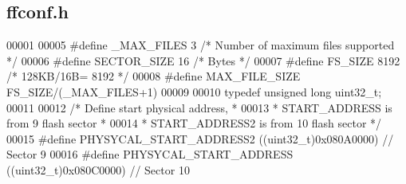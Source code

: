 \hypertarget{ffconf_8h_source}{\subsection{ffconf.\+h}
\label{ffconf_8h_source}
}

\begin{DoxyCode}
00001 
00005 \textcolor{preprocessor}{#define \_MAX\_FILES 3   }\textcolor{comment}{/* Number of maximum files supported */}\textcolor{preprocessor}{}
00006 \textcolor{preprocessor}{#define SECTOR\_SIZE 16 }\textcolor{comment}{/* Bytes */}\textcolor{preprocessor}{}
00007 \textcolor{preprocessor}{#define FS\_SIZE 8192  }\textcolor{comment}{/* 128KB/16B= 8192 */}\textcolor{preprocessor}{}
00008 \textcolor{preprocessor}{#define MAX\_FILE\_SIZE FS\_SIZE/(\_MAX\_FILES+1)}
00009 
00010 \textcolor{keyword}{typedef} \textcolor{keywordtype}{unsigned} \textcolor{keywordtype}{long} uint32\_t;
00011 
00012 \textcolor{comment}{/* Define start physical address,           *}
00013 \textcolor{comment}{ * START\_ADDRESS is from 9 flash sector     *}
00014 \textcolor{comment}{ * START\_ADDRESS2 is from 10 flash sector   */}
00015 \textcolor{preprocessor}{#define PHYSYCAL\_START\_ADDRESS2 ((uint32\_t)0x080A0000)  // Sector  9}
00016 \textcolor{preprocessor}{#define PHYSYCAL\_START\_ADDRESS ((uint32\_t)0x080C0000)  // Sector 10}
\end{DoxyCode}
